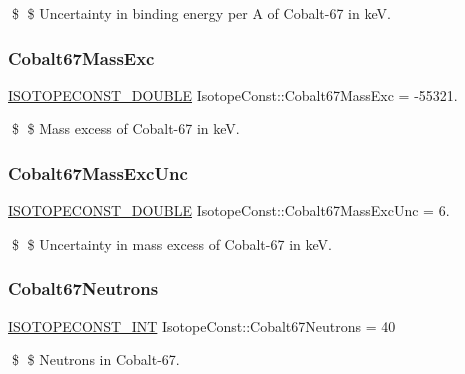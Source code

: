 \$ \$ Uncertainty in binding energy per A of Cobalt-\/67 in keV. \mbox{\label{group___isotope_const-_cobalt-_co67_gacd8c6c2e43c903d265bfab39ab2e8cfe}} 
\subsubsection{\texorpdfstring{Cobalt67\+Mass\+Exc}{Cobalt67MassExc}}
{\footnotesize\ttfamily \mbox{\hyperlink{group___isotope_const-_macros_ga8f45a7272ce02c0b4c65c44636ed719a}{I\+S\+O\+T\+O\+P\+E\+C\+O\+N\+S\+T\+\_\+\+D\+O\+U\+B\+LE}} Isotope\+Const\+::\+Cobalt67\+Mass\+Exc = -\/55321.}

\$ \$ Mass excess of Cobalt-\/67 in keV. \mbox{\label{group___isotope_const-_cobalt-_co67_ga2d4506daaf54b0175553ff34f57fd7ae}} 
\subsubsection{\texorpdfstring{Cobalt67\+Mass\+Exc\+Unc}{Cobalt67MassExcUnc}}
{\footnotesize\ttfamily \mbox{\hyperlink{group___isotope_const-_macros_ga8f45a7272ce02c0b4c65c44636ed719a}{I\+S\+O\+T\+O\+P\+E\+C\+O\+N\+S\+T\+\_\+\+D\+O\+U\+B\+LE}} Isotope\+Const\+::\+Cobalt67\+Mass\+Exc\+Unc = 6.}

\$ \$ Uncertainty in mass excess of Cobalt-\/67 in keV. \mbox{\label{group___isotope_const-_cobalt-_co67_ga46d9dfeda2ed8168a52b70706bb378f3}} 
\subsubsection{\texorpdfstring{Cobalt67\+Neutrons}{Cobalt67Neutrons}}
{\footnotesize\ttfamily \mbox{\hyperlink{group___isotope_const-_macros_ga5f18360b3e99483a35c32d789e62621c}{I\+S\+O\+T\+O\+P\+E\+C\+O\+N\+S\+T\+\_\+\+I\+NT}} Isotope\+Const\+::\+Cobalt67\+Neutrons = 40}

\$ \$ Neutrons in Cobalt-\/67. \mbox{\label{group___isotope_const-_cobalt-_co67_ga55eb3eb9e08475702539ceb39ba0fb4b}} 
